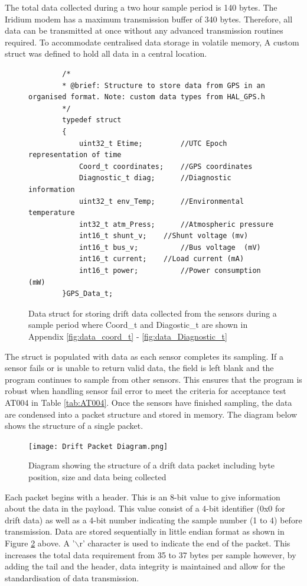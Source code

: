 The total data collected during a two hour sample period is 140 bytes. The Iridium modem has a maximum transmission buffer of 340 bytes. Therefore, all data can be transmitted at once without any advanced transmission routines required. To accommodate centralised data storage in volatile memory, A custom struct was defined to hold all data in a central location.

\begin{figure}[H]
	\centering
	\begin{lstlisting}
		/*
		* @brief: Structure to store data from GPS in an organised format. Note: custom data types from HAL_GPS.h
		*/
		typedef struct
		{
			uint32_t Etime;			//UTC Epoch representation of time
			Coord_t coordinates;	//GPS coordinates
			Diagnostic_t diag;		//Diagnostic information
			uint32_t env_Temp;		//Environmental temperature
			int32_t atm_Press;		//Atmospheric pressure
			int16_t shunt_v;    //Shunt voltage (mv)
			int16_t bus_v;			//Bus voltage  (mV)
			int16_t current;    //Load current (mA)
			int16_t power;			//Power consumption (mW)
		}GPS_Data_t;
	\end{lstlisting}
	\caption{Data struct for storing drift data collected from the sensors during a sample period where Coord\_t and Diagostic\_t are shown in Appendix \ref{fig:data_coord_t} - \ref{fig:data_Diagnostic_t}} 
	\label{fig:data_drift_struct}
\end{figure}

The struct is populated with data as each sensor completes its sampling. If a sensor fails or is unable to return valid data, the field is left blank and the program continues to sample from other sensors. This ensures that the program is robust when handling sensor fail error to meet the criteria for acceptance test AT004 in Table \ref{tab:AT004}. Once the sensors have finished sampling, the data are condensed into a packet structure and stored in memory. The diagram below shows the structure of a single packet.

\begin{figure}[H]
	\centering
	\texttt{[image: Drift Packet Diagram.png]}
	\caption{Diagram showing the structure of a drift data packet including byte position, size and data being collected}
	\label{fig:packet_structure}
\end{figure}

Each packet begins with a header. This is an 8-bit value to give information about the data in the payload. This value consist of a 4-bit identifier (0x0 for drift data) as well as a 4-bit number indicating the sample number (1 to 4) before transmission. Data are stored sequentially in little endian format as shown in Figure \ref{fig:packet_structure} above. A '$\backslash$r' character is used to indicate the end of the packet. This increases the total data requirement from 35 to 37 bytes per sample however, by adding the tail and the header, data integrity is maintained and allow for the standardisation of data transmission.\par 

